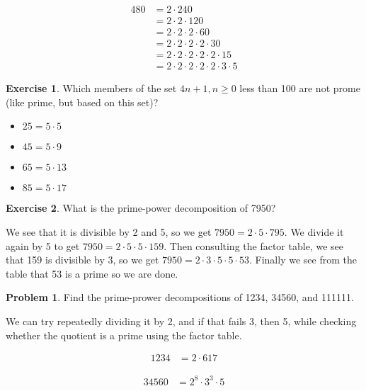 \documentclass{article}
\theoremstyle{definition}
\newtheorem{exercise}{Exercise}[section]
\newtheorem{problem}{Problem}[section]
\begin{document}
    \begin{align*}
    480 &= 2 \cdot 240 \\
           &= 2 \cdot 2 \cdot 120 \\
           &= 2 \cdot 2 \cdot 2 \cdot 60 \\
           &= 2 \cdot 2 \cdot 2 \cdot 2 \cdot 30 \\
           &= 2 \cdot 2 \cdot 2 \cdot 2 \cdot 2 \cdot 15 \\
           &= 2 \cdot 2 \cdot 2 \cdot 2 \cdot 2 \cdot 3 \cdot 5
  \end{align*}
  
  \begin{exercise}
    Which members of the set $4n + 1, n \geq 0$ less than 100 are not prome (like prime, but based on this set)?
  \end{exercise}
  
  \begin{itemize}
    \item $25 = 5 \cdot 5$
    \item $45 = 5 \cdot 9$
    \item $65 = 5 \cdot 13$
    \item $85 = 5 \cdot 17$
  \end{itemize}
  
  \begin{exercise}
    What is the prime-power decomposition of 7950?
  \end{exercise}
  
  We see that it is divisible by 2 and 5, so we get $7950 = 2 \cdot 5 \cdot 795$.
  We divide it again by 5 to get $7950 = 2 \cdot 5 \cdot 5 \cdot 159$. Then
  consulting the factor table, we see that 159 is divisible by 3, so we get
  $7950 = 2 \cdot 3 \cdot 5 \cdot 5 \cdot 53$. Finally we see from the table
  that 53 is a prime so we are done.
  
  \begin{problem}
    Find the prime-prower decompositions of 1234, 34560, and 111111.
  \end{problem}
  
  We can try repeatedly dividing it by 2, and if that fails 3, then 5, while checking
  whether the quotient is a prime using the factor table.
  
  \begin{align*}
    1234 &= 2 \cdot 617
  \end{align*}
  
  \begin{align*}
    34560 &= 2^8 \cdot 3^3 \cdot 5
  \end{align*}
  
\end{document}
